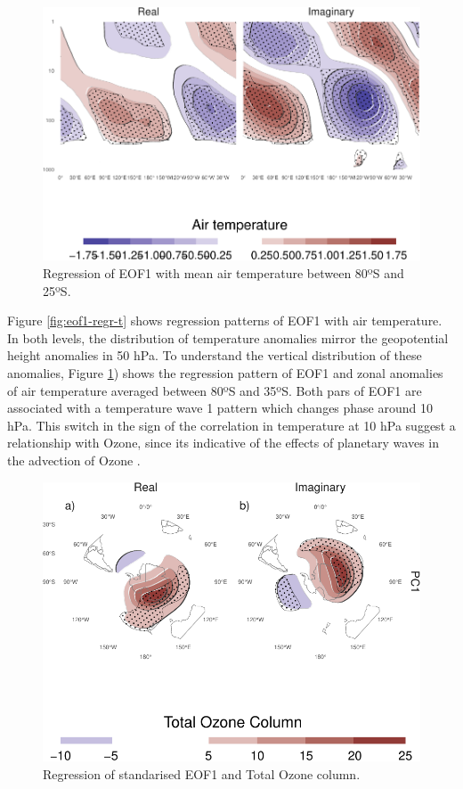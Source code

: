 \documentclass[smallextended]{svjour3}       %
\begin{document}
\begin{figure}
\centering
\includegraphics{../figures/t-vertical-1.pdf}
\caption{\label{fig:t-vertical}Regression of EOF1 with mean air temperature between 80ºS and 25ºS.}
\end{figure}

Figure \ref{fig:eof1-regr-t} shows regression patterns of EOF1 with air temperature. In both levels, the distribution of temperature anomalies mirror the geopotential height anomalies in 50 hPa. To understand the vertical distribution of these anomalies, Figure \ref{fig:t-vertical}) shows the regression pattern of EOF1 and zonal anomalies of air temperature averaged between 80ºS and 35ºS. Both pars of EOF1 are associated with a temperature wave 1 pattern which changes phase around 10 hPa. This switch in the sign of the correlation in temperature at 10 hPa suggest a relationship with Ozone, since its indicative of the effects of planetary waves in the advection of Ozone \citep{hartmann1979, rood1985, smith1995}.

\begin{figure}
\centering
\includegraphics{../figures/o3-regr-1.pdf}
\caption{\label{fig:o3-regr}Regression of standarised EOF1 and Total Ozone column.}
\end{figure}
\end{document}
